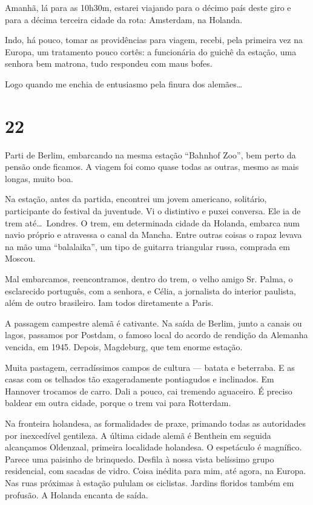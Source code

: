 Amanhã, lá para as 10h30m, estarei viajando para o décimo país deste giro e para a décima terceira cidade da rota: Amsterdam, na Holanda.

Indo, há pouco, tomar as providências para viagem, recebi, pela primeira vez na Europa, um tratamento pouco cortês: a funcionária do guichê da estação, uma senhora bem matrona, tudo respondeu com maus bofes.

Logo quando me enchia de entusiasmo pela finura dos alemães\ldots

\section*{22 \adfflatleafright {}}
Parti de Berlim, embarcando na mesma estação ``Bahnhof Zoo'', bem perto da pensão onde ficamos. A viagem foi como quase todas as outras, mesmo as mais longas, muito boa.

Na estação, antes da partida, encontrei um jovem americano, solitário, participante do festival da juventude. Vi o distintivo e puxei conversa. Ele ia de trem até\ldots\ Londres. O trem, em determinada cidade da Holanda, embarca num navio próprio e atravessa o canal da Mancha. Entre outras coisas o rapaz levava na mão uma ``balalaika'', um tipo de guitarra triangular russa, comprada em Moscou.

Mal embarcamos, reencontramos, dentro do trem, o velho amigo Sr. Palma, o esclarecido português, com a senhora, e Célia, a jornalista do interior paulista, além de outro brasileiro. Iam todos diretamente a Paris.

A passagem campestre alemã é cativante. Na saída de Berlim, junto a canais ou lagos, passamos por Postdam, o famoso local do acordo de rendição da Alemanha vencida, em 1945. Depois, Magdeburg, que tem enorme estação.

Muita pastagem, cerradíssimos campos de cultura --- batata e beterraba. E as casas com os telhados tão exageradamente pontiagudos e inclinados. Em Hannover trocamos de carro. Dali a pouco, cai tremendo aguaceiro. É preciso baldear em outra cidade, porque o trem vai para Rotterdam.

Na fronteira holandesa, as formalidades de praxe, primando todas as autoridades por inexcedível gentileza. A última cidade alemã é Benthein em seguida alcançamos Oldenzaal, primeira localidade holandesa. O espetáculo é magnífico. Parece uma paisinho de brinquedo. Desfila à nossa vista belíssimo grupo residencial, com sacadas de vidro. Coisa inédita para mim, até agora, na Europa. Nas ruas próximas à estação pululam os ciclistas. Jardins floridos também em profusão. A Holanda encanta de saída.

